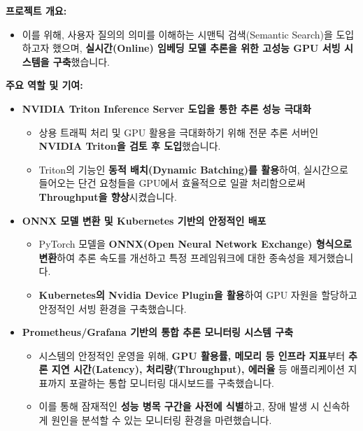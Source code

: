 \documentclass[letterpaper,11pt]{article}
\begin{document}
    {
      \textbf{프로젝트 개요:}
      \begin{itemize}[leftmargin=*]
          \item 이를 위해, 사용자 질의의 의미를 이해하는 시맨틱 검색(Semantic Search)을 도입하고자 했으며, \textbf{실시간(Online) 임베딩 모델 추론을 위한 고성능 GPU 서빙 시스템을 구축}했습니다.
      \end{itemize}

      \textbf{주요 역할 및 기여:}
      \begin{itemize}[leftmargin=*]
          \item \textbf{NVIDIA Triton Inference Server 도입을 통한 추론 성능 극대화}
              \begin{itemize}[leftmargin=*, label=$\circ$]
                  \item 상용 트래픽 처리 및 GPU 활용을 극대화하기 위해 전문 추론 서버인 \textbf{NVIDIA Triton을 검토 후 도입}했습니다.
                  \item Triton의 기능인 \textbf{동적 배치(Dynamic Batching)를 활용}하여, 실시간으로 들어오는 단건 요청들을 GPU에서 효율적으로 일괄 처리함으로써 \textbf{Throughput을 향상}시켰습니다.
              \end{itemize}

          \item \textbf{ONNX 모델 변환 및 Kubernetes 기반의 안정적인 배포}
              \begin{itemize}[leftmargin=*, label=$\circ$]
                  \item PyTorch 모델을 \textbf{ONNX(Open Neural Network Exchange) 형식으로 변환}하여 추론 속도를 개선하고 특정 프레임워크에 대한 종속성을 제거했습니다.
                  \item \textbf{Kubernetes의 Nvidia Device Plugin을 활용}하여 GPU 자원을 할당하고 안정적인 서빙 환경을 구축했습니다.
              \end{itemize}
              
          \item \textbf{Prometheus/Grafana 기반의 통합 추론 모니터링 시스템 구축}
              \begin{itemize}[leftmargin=*, label=$\circ$]
                  \item 시스템의 안정적인 운영을 위해, \textbf{GPU 활용률, 메모리 등 인프라 지표}부터 \textbf{추론 지연 시간(Latency), 처리량(Throughput), 에러율} 등 애플리케이션 지표까지 포괄하는 통합 모니터링 대시보드를 구축했습니다.
                  \item 이를 통해 잠재적인 \textbf{성능 병목 구간을 사전에 식별}하고, 장애 발생 시 신속하게 원인을 분석할 수 있는 모니터링 환경을 마련했습니다.
              \end{itemize}
              

\end{itemize}}
\end{document}
